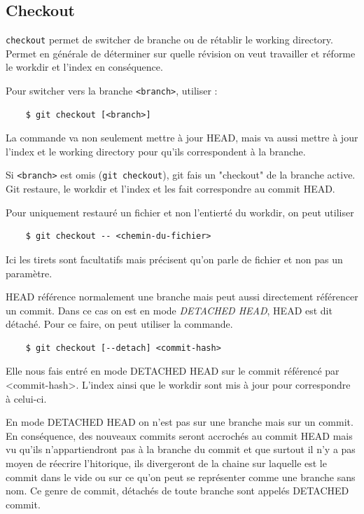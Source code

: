 \documentclass[a4paper, 12pt]{article}
\begin{document}
    \subsection{Checkout}
    \lstinline{checkout} permet de switcher de branche ou de rétablir le
    working directory. Permet en générale de déterminer sur quelle révision on
    veut travailler et réforme le workdir  et l'index en conséquence.

    Pour switcher vers la branche \lstinline{<branch>}, utiliser :
    \begin{lstlisting}
    $ git checkout [<branch>]
    \end{lstlisting}
    La commande va non seulement mettre à jour HEAD, mais va aussi mettre à jour
    l'index et le working directory pour qu'ils correspondent à la branche.

    Si \lstinline{<branch>} est omis (\lstinline{git checkout}), git fais un
    "checkout" de la branche active.  Git restaure, le workdir et l'index
    et les fait correspondre au commit HEAD.

    Pour uniquement restauré un fichier et non l'entierté du workdir, on peut
    utiliser 

    \begin{lstlisting}
    $ git checkout -- <chemin-du-fichier>
    \end{lstlisting}
    Ici les tirets sont facultatifs mais précisent qu'on parle de fichier et non
    pas un paramètre.

    HEAD référence normalement une branche mais peut aussi directement
    référencer un commit. Dans ce cas on est en mode \textit{DETACHED HEAD}, 
    HEAD est dit détaché.
    Pour ce faire, on peut utiliser la commande.

    \begin{lstlisting}
    $ git checkout [--detach] <commit-hash>
    \end{lstlisting}

    Elle nous fais entré en mode DETACHED HEAD sur le commit référencé par
    <commit-hash>. L'index ainsi que le workdir sont mis à jour pour 
    correspondre à celui-ci.

    En mode DETACHED HEAD on n'est pas sur une branche mais sur un commit.
    En conséquence, des nouveaux commits seront accrochés au commit HEAD mais
    vu qu'ils n'appartiendront pas à la branche du commit et que surtout il n'y
    a pas moyen de réecrire l'hitorique, ils divergeront de la chaine sur
    laquelle est le commit dans le vide ou sur ce qu'on peut se représenter
    comme une branche sans nom. Ce genre de commit, détachés de toute branche
    sont appelés DETACHED commit. 
\end{document}
